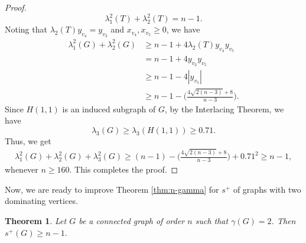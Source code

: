 \documentclass{article}
\newtheorem{theorem}{Theorem}[section]
\begin{document}
\begin{proof}
\begin{equation}
\lambda_1^2(T)+\lambda_2^2(T)= n-1.
\end{equation}
Noting that $\lambda_2(T)y_{v_4} = y_{v_3}$ and $x_{v_4}, x_{v_5}\ge 0$, we have
\begin{align*}
    \lambda^2_1(G) + \lambda^2_2(G) &\geq n-1 +  4\lambda_2(T)y_{v_4}y_{v_5} \\
    &= n-1 +4y_{v_3}y_{v_5} \\
    &\ge n-1 -4|y_{v_5}| \\
    &\ge n-1 -\bigg(\frac{4\sqrt{2(n-3)}+8}{n-3}\bigg).
\end{align*}
Since $H(1,1)$ is an induced subgraph of $G$, by the Interlacing Theorem, we have 
\begin{equation}
    \lambda_3(G)\ge \lambda_3(H(1,1))\ge 0.71.
\end{equation}
Thus, we get
\begin{align*}
    \lambda_1^2(G) + \lambda_2^2(G) + \lambda_3^2(G) \ge (n-1) -\bigg(\frac{4\sqrt{2(n-3)}+8}{n-3}\bigg) + 0.71^2  \ge n-1,  
\end{align*}
whenever $n\ge 160$. This completes the proof.
\end{proof}

Now, we are ready to improve Theorem \ref{thm:n-gamma} for $s^+$ of graphs with two dominating vertices.

\begin{theorem} Let $G$ be a connected graph of order $n$ such that $\gamma(G)=2$. Then $s^+(G)\geq n-1.$
\end{theorem}
\end{document}
